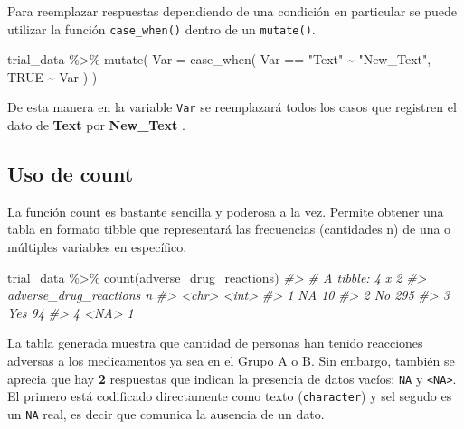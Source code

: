 \documentclass[
]{book}
\newenvironment{Shaded}{\begin{snugshade}}{\end{snugshade}}
\newcommand{\AttributeTok}[1]{\textcolor[rgb]{0.77,0.63,0.00}{#1}}
\newcommand{\CommentTok}[1]{\textcolor[rgb]{0.56,0.35,0.01}{\textit{#1}}}
\newcommand{\ConstantTok}[1]{\textcolor[rgb]{0.00,0.00,0.00}{#1}}
\newcommand{\FunctionTok}[1]{\textcolor[rgb]{0.00,0.00,0.00}{#1}}
\newcommand{\NormalTok}[1]{#1}
\newcommand{\SpecialCharTok}[1]{\textcolor[rgb]{0.00,0.00,0.00}{#1}}
\newcommand{\StringTok}[1]{\textcolor[rgb]{0.31,0.60,0.02}{#1}}
\begin{document}
Para reemplazar respuestas dependiendo de una condición en particular se puede utilizar la función \texttt{case\_when()} dentro de un \texttt{mutate()}.

\begin{Shaded}
\begin{Highlighting}[]
\NormalTok{trial\_data }\SpecialCharTok{\%\textgreater{}\%} 
  \FunctionTok{mutate}\NormalTok{(}
    \AttributeTok{Var =} \FunctionTok{case\_when}\NormalTok{(}
\NormalTok{      Var }\SpecialCharTok{==} \StringTok{"Text"} \SpecialCharTok{\textasciitilde{}} \StringTok{"New\_Text"}\NormalTok{, }
      \ConstantTok{TRUE} \SpecialCharTok{\textasciitilde{}}\NormalTok{ Var}
\NormalTok{    )}
\NormalTok{  )}
\end{Highlighting}
\end{Shaded}

De esta manera en la variable \texttt{Var} se reemplazará todos los casos que registren el dato de \textbf{Text} por \textbf{New\_Text} .

\hypertarget{uso-de-count}{%
\subsection{Uso de count}\label{uso-de-count}}

La función count es bastante sencilla y poderosa a la vez. Permite obtener una tabla en formato tibble que representará las frecuencias (cantidades n) de una o múltiples variables en específico.

\begin{Shaded}
\begin{Highlighting}[]
\NormalTok{trial\_data }\SpecialCharTok{\%\textgreater{}\%} 
  \FunctionTok{count}\NormalTok{(adverse\_drug\_reactions)}
\CommentTok{\#\textgreater{} \# A tibble: 4 x 2}
\CommentTok{\#\textgreater{}   adverse\_drug\_reactions     n}
\CommentTok{\#\textgreater{}   \textless{}chr\textgreater{}                  \textless{}int\textgreater{}}
\CommentTok{\#\textgreater{} 1 NA                        10}
\CommentTok{\#\textgreater{} 2 No                       295}
\CommentTok{\#\textgreater{} 3 Yes                       94}
\CommentTok{\#\textgreater{} 4 \textless{}NA\textgreater{}                       1}
\end{Highlighting}
\end{Shaded}

La tabla generada muestra que cantidad de personas han tenido reacciones adversas a los medicamentos ya sea en el Grupo A o B. Sin embargo, también se aprecia que hay \textbf{2} respuestas que indican la presencia de datos vacíos: \texttt{NA} y \texttt{\textless{}NA\textgreater{}}. El primero está codificado directamente como texto (\texttt{character}) y sel segudo es un \texttt{NA} real, es decir que comunica la ausencia de un dato.
\end{document}
